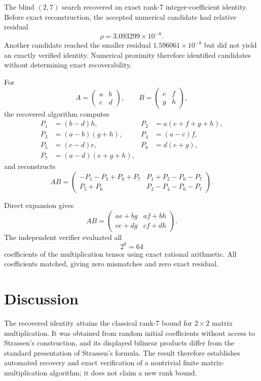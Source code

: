 \documentclass[12pt]{article}
\begin{document}
The blind $(2,7)$ search recovered an exact rank-7
integer-coefficient identity. Before exact reconstruction, the
accepted numerical candidate had relative residual
\[
\rho = 3.093299\times10^{-8}.
\]
Another candidate reached the smaller residual
$1.596061\times10^{-8}$ but did not yield an exactly verified
identity. Numerical proximity therefore identified candidates without
determining exact recoverability.

For
\[
A=
\begin{pmatrix}
a & b\\
c & d
\end{pmatrix},
\qquad
B=
\begin{pmatrix}
e & f\\
g & h
\end{pmatrix},
\]
the recovered algorithm computes
\[
\begin{aligned}
P_1 &= (b-d)h, &
P_2 &= a(e+f+g+h),\\
P_3 &= (a-b)(g+h), &
P_4 &= (a-c)f,\\
P_5 &= (c-d)e, &
P_6 &= d(e+g),\\
P_7 &= (a-d)(e+g+h),
\end{aligned}
\]
and reconstructs
\[
AB=
\begin{pmatrix}
-P_1-P_3+P_6+P_7 &
P_1+P_2-P_6-P_7\\
P_5+P_6 &
P_2-P_4-P_6-P_7
\end{pmatrix}.
\]

Direct expansion gives
\[
AB=
\begin{pmatrix}
ae+bg & af+bh\\
ce+dg & cf+dh
\end{pmatrix}.
\]
The independent verifier evaluated all
\[
2^6=64
\]
coefficients of the multiplication tensor using exact rational
arithmetic. All coefficients matched, giving zero mismatches and zero
exact residual.

\section{Discussion}

The recovered identity attains the classical rank-7 bound for
$2\times2$ matrix multiplication. It was obtained from random initial
coefficients without access to Strassen's construction, and its
displayed bilinear products differ from the standard presentation of
Strassen's formula. The result therefore establishes automated
recovery and exact verification of a nontrivial finite
matrix-multiplication algorithm; it does not claim a new rank bound.
\end{document}
